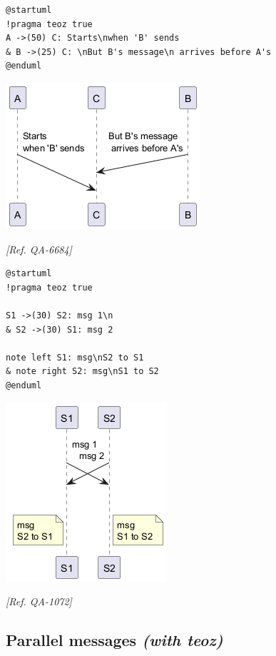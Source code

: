 \begin{verbatim}
@startuml
!pragma teoz true
A ->(50) C: Starts\nwhen 'B' sends
& B ->(25) C: \nBut B's message\n arrives before A's
@enduml
\end{verbatim}
\begin{center}
\includegraphics[scale=0.60]{imgw/img-bb31618148ec36b7aca9b1947a4adec9.png}
\end{center}
\textit{[Ref. QA-6684]}


\begin{verbatim}
@startuml
!pragma teoz true

S1 ->(30) S2: msg 1\n
& S2 ->(30) S1: msg 2

note left S1: msg\nS2 to S1
& note right S2: msg\nS1 to S2
@enduml
\end{verbatim}
\begin{center}
\includegraphics[scale=0.60]{imgw/img-8fd104e79e6b85b1345f9763b4b5881d.png}
\end{center}
\textit{[Ref. QA-1072]}
%
%
\subsection{Parallel messages \textit{(with teoz)}}


